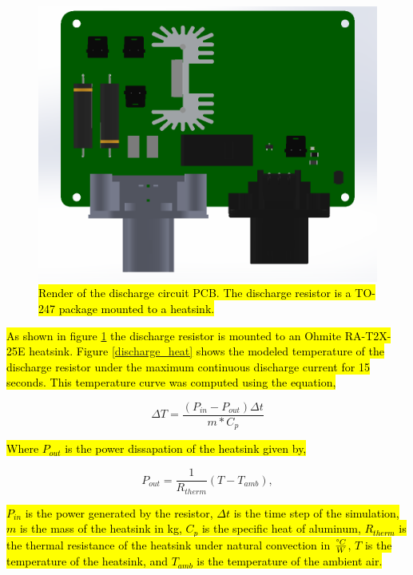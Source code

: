 \documentclass{article}
\DeclareRobustCommand{\hlr}[1]{{\sethlcolor{pink}\hl{#1}}}
\begin{document}
\begin{figure}[H]
    \centering
    \includegraphics[width = 0.7 \textwidth]{discharge_pcb}
    \caption{\hlr{Render of the discharge circuit PCB. The discharge resistor is a TO-247 package mounted to a heatsink. }}
    \label{discharge_pcb}
\end{figure}

\hl{As shown in figure {\ref{discharge_pcb}} the discharge resistor is mounted to an Ohmite RA-T2X-25E heatsink. Figure {\ref{discharge_heat}} shows the modeled temperature of the discharge resistor under the maximum continuous discharge current for 15 seconds. This temperature curve was computed using the equation,}

\begin{equation}
    \Delta T = \frac{(P_{in} - P_{out}) \Delta t}{m*C_p}
\end{equation}

\hl{Where $P_{out}$ is the power dissapation of the heatsink given by, }

\begin{equation}
    P_{out} = \frac{1}{R_{therm}}(T-T_{amb}),
\end{equation}

\hl{$P_{in}$ is the power generated by the resistor, $\Delta t$ is the time step of the simulation, $m$ is the mass of the heatsink in kg, $C_p$ is the specific heat of aluminum, $R_{therm}$ is the thermal resistance of the heatsink under natural convection in $\frac{\degree C}{W}$, $T$ is the temperature of the heatsink, and $T_{amb}$ is the temperature of the ambient air. }
\end{document}
